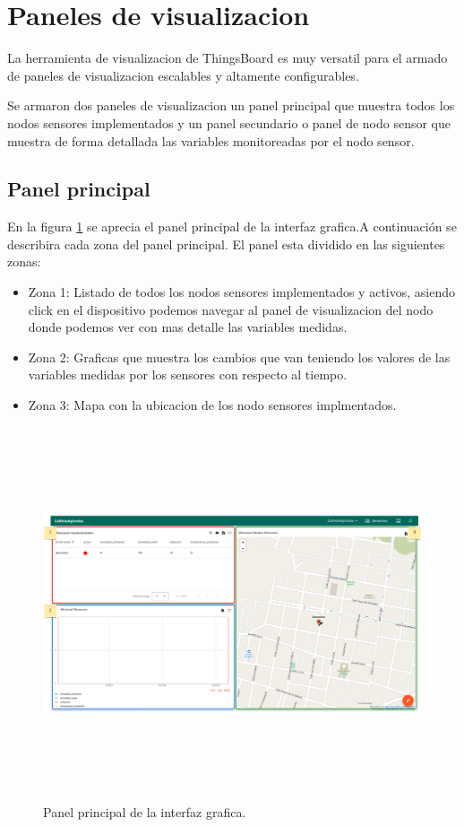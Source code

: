 \clearpage
\section{Paneles de visualizacion}
La herramienta de visualizacion de ThingsBoard es muy versatil para el armado de paneles de visualizacion escalables y altamente configurables.

Se armaron dos paneles de visualizacion un panel principal que muestra todos los nodos sensores implementados y un panel secundario o panel de nodo sensor que muestra de forma detallada las variables monitoreadas por el nodo sensor.
\subsection{Panel principal} 

En la figura \ref{fig:Panel principal} se aprecia el panel principal de la interfaz grafica.A continuación se describira cada zona del panel principal.
El panel esta dividido en las siguientes zonas:
\begin{itemize}
  \item Zona 1: Listado de todos los nodos sensores implementados y activos, asiendo click en el dispositivo podemos navegar al panel de visualizacion del nodo donde podemos ver con mas detalle las variables medidas.
  \item Zona 2: Graficas que muestra los cambios que van teniendo los valores de las variables medidas por los sensores con respecto al tiempo.
  \item Zona 3: Mapa con la ubicacion de los nodo sensores implmentados.
\end{itemize}

\begin{figure}[h]
  \centering
	\includegraphics[width=\textwidth, height=11cm]{./Figures/panel_principal_editado.png}
  \caption{Panel principal de la interfaz grafica.}
	\label{fig:Panel principal}
\end{figure}


